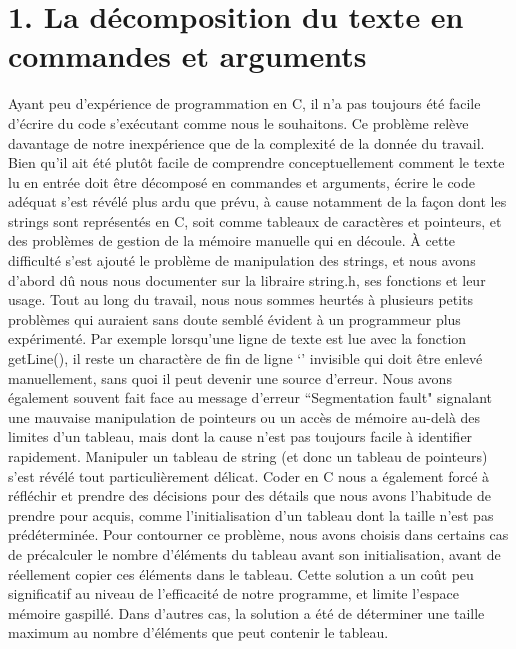 \documentclass{article}
\begin{document}
\section*{ 1. La décomposition du texte en commandes et arguments }
Ayant peu d’expérience de programmation en C, il n’a pas toujours été facile d’écrire du code s’exécutant comme nous le souhaitons. Ce problème relève davantage de notre inexpérience que de la complexité de la donnée du travail. Bien qu’il ait été plutôt facile de comprendre conceptuellement comment le texte lu en entrée doit être décomposé en commandes et arguments, écrire le code adéquat s’est révélé plus ardu que prévu, à cause notamment de la façon dont les strings sont représentés en C, soit comme tableaux de caractères et pointeurs, et des problèmes de gestion de la mémoire manuelle qui en découle.  À cette difficulté s’est ajouté le problème de manipulation des strings, et nous avons d’abord dû nous nous documenter sur la libraire string.h, ses fonctions et leur usage.  
Tout au long du travail, nous nous sommes heurtés à plusieurs petits problèmes qui auraient sans doute semblé évident à un programmeur plus expérimenté. Par exemple lorsqu’une ligne de texte est lue avec la fonction getLine(), il reste un charactère de fin de ligne ‘\n’ invisible qui doit être enlevé manuellement, sans quoi il peut devenir une source d’erreur.  Nous avons également souvent fait face au message d’erreur “Segmentation fault" signalant une mauvaise manipulation de pointeurs ou un accès de mémoire au-delà des limites d’un tableau, mais dont la cause n’est pas toujours facile à identifier rapidement. Manipuler un tableau de string (et donc un tableau de pointeurs) s’est révélé tout particulièrement délicat. 
Coder en C nous a également forcé à réfléchir et prendre des décisions pour des détails que nous avons l’habitude de prendre pour acquis, comme l’initialisation d’un tableau dont la taille n’est pas prédéterminée. Pour contourner ce problème, nous avons choisis dans certains cas de précalculer le nombre d’éléments du tableau avant son initialisation, avant de réellement copier ces éléments dans le tableau. Cette solution a un coût peu significatif au niveau de l’efficacité de notre programme, et limite l’espace mémoire gaspillé. Dans d’autres cas, la solution a été de déterminer une taille maximum au nombre d’éléments que peut contenir le tableau.
\end{document}
